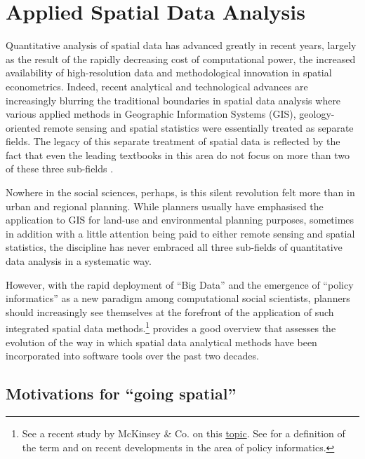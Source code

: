 \chapter{Applied Spatial Data Analysis}\label{chap_SpatialStats}
Quantitative analysis of spatial data has advanced greatly in recent years, largely as the result of the rapidly decreasing cost of computational power, the increased availability of high-resolution data and methodological innovation in spatial econometrics. Indeed, recent analytical and technological advances are increasingly blurring the traditional boundaries in spatial data analysis where various applied methods in Geographic Information Systems (GIS), geology-oriented remote sensing and spatial statistics were essentially treated as separate fields. The legacy of this separate treatment of spatial data is reflected by the fact that even the leading textbooks in this area do not focus on more than two of these three sub-fields \citep[e.g.][]{Davis2002a,O'Sullivan2003,Campbell2006}.

Nowhere in the social sciences, perhaps, is this silent revolution felt more than in urban and regional planning. While planners usually have emphasised the application to GIS for land-use and environmental planning purposes, sometimes in addition with a little attention being paid to either remote sensing and spatial statistics, the discipline has never embraced all three sub-fields of quantitative data analysis in a systematic way. 

However, with the rapid deployment of ``Big Data'' and the emergence of ``policy informatics'' as a new paradigm among computational social scientists, planners should increasingly see themselves at the forefront of the application of such integrated spatial data methods.\footnote{See a recent study by McKinsey \& Co. on this \href{http://www.mckinsey.com/Insights/MGI/Research/Technology\_and\_Innovation/Big\_data\_The\_next\_frontier\_for\_innovation}{topic}. See \citet{Barrett2011} for a definition of the term and on recent developments in the area of policy informatics.} \citet{Anselin2012} provides a good overview that assesses the evolution of the way in which spatial data analytical methods have been incorporated into software tools over the past two decades.


\section{Motivations for ``going spatial''}

